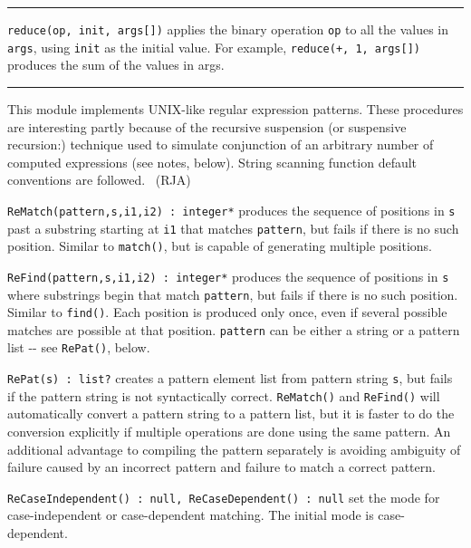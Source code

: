 \vspace{0.25cm}\hrule{}

\texttt{reduce(op, init, args[])} applies the binary
operation \texttt{op} to all the values in \texttt{args}, using
\texttt{init} as the initial value. For example,
\texttt{reduce({\textquotedbl}+{\textquotedbl}, 1, args[])} produces
the sum of the values in args. 

\vspace{0.25cm}\hrule{}

This module implements UNIX-like regular
expression patterns. These procedures are interesting partly because of
the {\textquotedbl}recursive suspension{\textquotedbl} (or
{\textquotedbl}suspensive recursion{\textquotedbl}:)
technique used to simulate conjunction of an arbitrary number of
computed expressions (see notes, below). String scanning function
default conventions are followed. \ (RJA)

\texttt{ReMatch(pattern,s,i1,i2) : integer*} produces the sequence of
positions in \texttt{s} past a substring starting at \texttt{i1} that
matches \texttt{pattern}, but fails if there is no such position.
Similar to \texttt{match()}, but is capable of generating multiple
positions.

\texttt{ReFind(pattern,s,i1,i2) : integer*} produces the sequence of
positions in \texttt{s} where substrings begin that match
\texttt{pattern}, but fails if there is no such position. Similar to
\texttt{find()}. Each position is produced only once, even if several
possible matches are possible at that position. \texttt{pattern} can be
either a string or a pattern list -{}- see \texttt{RePat()}, below.

\texttt{RePat(s) : list?} creates a pattern element list from pattern
string \texttt{s}, but fails if the pattern string is not syntactically
correct. \texttt{ReMatch()} and \texttt{ReFind()} will automatically
convert a pattern string to a pattern list, but it is faster to do the
conversion explicitly if multiple operations are done using the same
pattern. An additional advantage to compiling the pattern separately is
avoiding ambiguity of failure caused by an incorrect pattern and
failure to match a correct pattern.

\texttt{ReCaseIndependent() : null, ReCaseDependent() : null} set the
mode for case-independent or case-dependent matching. The initial mode
is case-dependent.

